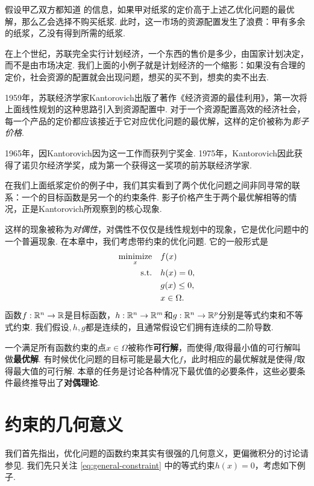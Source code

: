 假设甲乙双方都知道 的信息，如果甲对纸浆的定价高于上述乙优化问题的最优解，那么乙会选择不购买纸浆. 此时，这一市场的资源配置发生了浪费：甲有多余的纸浆，乙没有得到所需的纸浆.

在上个世纪，苏联完全实行计划经济，一个东西的售价是多少，由国家计划决定，而不是由市场决定. 我们上面的小例子就是计划经济的一个缩影：如果没有合理的定价，社会资源的配置就会出现问题，想买的买不到，想卖的卖不出去.

1959年，苏联经济学家Kantorovich出版了著作《经济资源的最佳利用》，第一次将上面线性规划的这种思路引入到资源配置中. 对于一个资源配置高效的经济社会，每一个产品的定价都应该接近于它对应优化问题的最优解，这样的定价被称为\emph{影子价格}. 

1965年，因Kantorovich因为这一工作而获列宁奖金. 1975年，Kantorovich因此获得了诺贝尔经济学奖，成为第一个获得这一奖项的前苏联经济学家. 

在我们上面纸浆定价的例子中，我们其实看到了两个优化问题之间非同寻常的联系：一个的目标函数是另一个的约束条件. 影子价格产生于两个最优解相等的情况，正是Kantorovich所观察到的核心现象. 

这样的现象被称为\emph{对偶性}，对偶性不仅仅是线性规划中的现象，它是优化问题中的一个普遍现象. 在本章中，我们考虑带约束的优化问题. 它的一般形式是
\begin{equation}
\begin{aligned}
    \operatorname*{minimize}_x\quad& f(x) \\
    \text{s.t.}\quad& h(x)=0,\\
    & g(x)\leq 0, \\
    & x \in \Omega.
\end{aligned}\label{eq:general-constraint}    
\end{equation}
函数$f:\mathbb{R}^n\to \mathbb{R}$是目标函数，$h:\mathbb{R}^n\to \mathbb{R}^m$和$g:\mathbb{R}^n\to \mathbb{R}^p$分别是等式约束和不等式约束. 我们假设$
,h,g$都是连续的，且通常假设它们拥有连续的二阶导数.

一个满足所有函数约束的点$x\in\Omega$被称作\textbf{可行解}，而使得$f$取得最小值的可行解叫做\textbf{最优解}. 有时候优化问题的目标可能是最大化$f$，此时相应的最优解就是使得$f$取得最大值的可行解. 本章的任务是讨论各种情况下最优值的必要条件，这些必要条件最终推导出了\textbf{对偶理论}. 

\section{约束的几何意义}\label{sec:constraint-geometry}

我们首先指出，优化问题的函数约束其实有很强的几何意义，更偏微积分的讨论请参见. 我们先只关注 \eqref{eq:general-constraint} 中的等式约束$h(x)=0$，考虑如下例子. 

